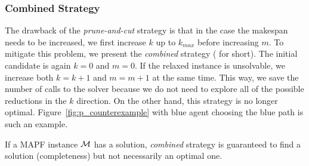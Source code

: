 




\subsubsection{Combined Strategy}

The drawback of the \emph{prune-and-cut} strategy is that in the case the makespan needs to be increased, we first increase $k$ up to $k_{max}$ before increasing $m$. To mitigate this problem, we present the \emph{combined} strategy (\ssc{} for short). The initial candidate is again $k=0$ and $m=0$. If the relaxed instance is unsolvable, we increase both $k=k+1$ and $m=m+1$ at the same time. This way, we save the number of calls to the solver because we do not need to explore all of the possible reductions in the $k$ direction. On the other hand, this strategy is no longer optimal. Figure~\ref{fig:p_counterexample} with blue agent choosing the blue path is such an example.

\begin{prop}
If a MAPF instance $\mathcal{M}$ has a solution, \emph{combined} strategy is guaranteed to find a solution (completeness) but not necessarily an optimal one.~\cite{AAMAS_corridors}
\end{prop}


